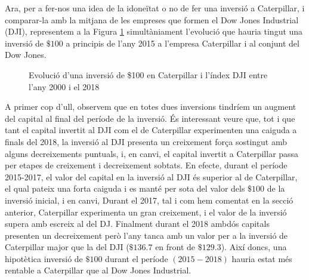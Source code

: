 \documentclass{article}
\numberwithin{table}{section}
\numberwithin{figure}{section}
\numberwithin{equation}{section}
\begin{document}
Ara, per a fer-nos una idea de la idoneïtat o no de fer una inversió a Caterpillar, i comparar-la amb la mitjana de les empreses que formen el Dow Jones Industrial (DJI), representem a la Figura \ref{fig:inversio} simultàniament l'evolució que hauria tingut una inversió de $\$100$ a principis de l'any 2015 a l'empresa Caterpillar i al conjunt del Dow Jones.
\begin{figure}[H]
	\centering \sffamily \small
	
	\caption{Evolució d'una inversió de \$100 en Caterpillar i l'índex DJI entre l'any 2000 i el 2018}
	\label{fig:inversio}
\end{figure}

A primer cop d'ull, observem que en totes dues inversions tindríem un augment del capital al final del període de la inversió. És interessant veure que, tot i que tant el capital invertit al DJI com el de Caterpillar experimenten una caiguda a finals del 2018, la inversió al DJI presenta un creixement força sostingut amb alguns decreixements puntuals, i, en canvi, el capital invertit a Caterpillar passa per etapes de creixement i decreixement sobtats.
En efecte, durant el període 2015-2017, el valor del capital en la inversió al DJI és superior al de Caterpillar, el qual pateix una forta caiguda i es manté per sota del valor dels $\$100$ de la inversió inicial, i en canvi, Durant el 2017, tal i com hem comentat en la secció anterior, Caterpillar experimenta un gran creixement, i el valor de la inversió supera amb escreix al del DJ. Finalment durant el 2018 ambdós capitals presenten un decreixement però l'any tanca amb un valor per a la inversió de Caterpillar major que la del DJI  ($\$136.7$ en front de  $\$129.3$). Així doncs, una hipotètica inversió de $\$100$ durant el període $(2015-2018)$ hauria estat més rentable a Caterpillar que al Dow Jones Industrial.
\end{document}
